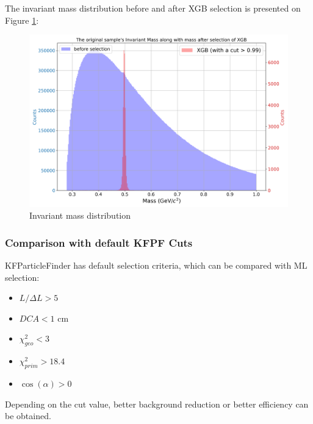 The invariant mass distribution before and after XGB selection is presented on Figure \ref{Invariant mass distribution}:
\begin{figure}[h!]
    \centering
    \includegraphics[width=.88\textwidth]{img/cut_visualization.png}
    \caption{Invariant mass distribution}
    \label{Invariant mass distribution}
\end{figure}


\subsubsection{Comparison with default KFPF Cuts}
KFParticleFinder has default selection criteria, which can be compared with ML selection:
\begin{itemize}
    \item $L/\Delta L > 5 $
    \item $DCA < 1 $ cm
    \item $\chi^2_{geo} < 3 $
    \item $\chi^2_{prim} > 18.4 $
    \item $\cos(\alpha) > 0 $
\end{itemize}
Depending on the cut value,  better background reduction or better efficiency can be obtained.

